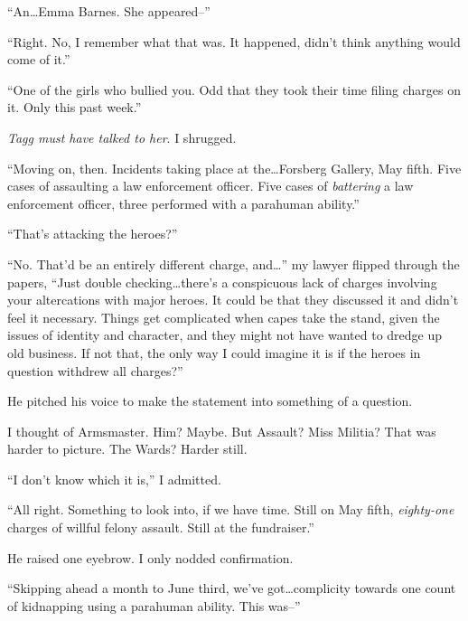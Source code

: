 ``An\ldots Emma Barnes.  She appeared--''



``Right.  No, I remember what that was.  It happened, didn't think anything would come of it.''



``One of the girls who bullied you.  Odd that they took their time filing charges on it.  Only this past week.''



\emph{Tagg must have talked to her}.  I shrugged.



``Moving on, then.  Incidents taking place at the\ldots Forsberg Gallery, May fifth.  Five cases of assaulting a law enforcement officer.  Five cases of \emph{battering} a law enforcement officer, three performed with a parahuman ability.''



``That's attacking the heroes?''



``No.  That'd be an entirely different charge, and\ldots'' my lawyer flipped through the papers, ``Just double checking\ldots there's a conspicuous lack of charges involving your altercations with major heroes.  It could be that they discussed it and didn't feel it necessary.  Things get complicated when capes take the stand, given the issues of identity and character, and they might not have wanted to dredge up old business.  If not that, the only way I could imagine it is if the heroes in question withdrew all charges?''



He pitched his voice to make the statement into something of a question.



I thought of Armsmaster.  Him?  Maybe.  But Assault?  Miss Militia?  That was harder to picture.  The Wards?  Harder still.



``I don't know which it is,'' I admitted.



``All right.  Something to look into, if we have time.  Still on May fifth, \emph{eighty-one }charges of willful felony assault.  Still at the fundraiser.''



He raised one eyebrow.  I only nodded confirmation.



``Skipping ahead a month to June third, we've got\ldots complicity towards one count of kidnapping using a parahuman ability.  This was--''



